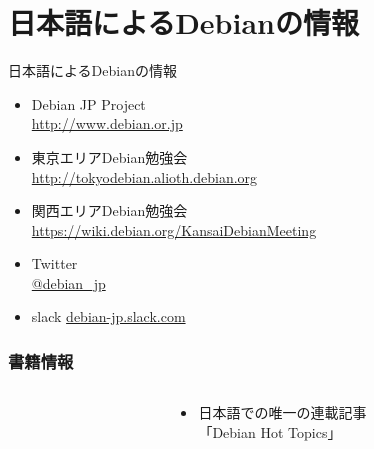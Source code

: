 \documentclass[cjk,c,squeeze,shrink,dvipdfmx,12pt]{beamer}
\begin{document}


\section{日本語によるDebianの情報}

\begin{frame}[fragile]{日本語によるDebianの情報}
  \begin{itemize}
  \item Debian JP Project \\
    \url{http://www.debian.or.jp}
  \item 東京エリアDebian勉強会\\
    \url{http://tokyodebian.alioth.debian.org}
  \item 関西エリアDebian勉強会 \\
    \url{https://wiki.debian.org/KansaiDebianMeeting}
  \item Twitter \\
    \url{@debian_jp}
  \item slack
    \url{debian-jp.slack.com}
  \end{itemize}
\end{frame}

\begin{frame}
  \frametitle{書籍情報}
  \begin{columns}
    \begin{column}{.5\paperwidth}
      \centering
    \end{column}
    \begin{column}{.5\paperwidth}
      \begin{itemize}
      \item %
        日本語での唯一の連載記事 \\
        「Debian Hot Topics」
      \end{itemize}
    \end{column}
  \end{columns}
\end{frame}
\end{document}
